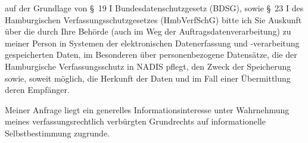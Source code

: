 auf der Grundlage von §~19 I Bundesdatenschutzgesetz (BDSG), sowie
§~23 I des Hamburgischen Verfassungsschutzgesetzes (HmbVerfSchG) bitte ich Sie
Auskunft über die durch Ihre Behörde (auch im Weg der Auftragsdatenverarbeitung)
zu meiner Person in Systemen der elektronischen Datenerfassung und -verarbeitung
gespeicherten Daten, im Besonderen über personenbezogene Datensätze, die der
Hamburgische Verfassungsschutz in NADIS pflegt, den Zweck der Speicherung sowie,
soweit möglich, die Herkunft der Daten und im Fall einer Übermittlung deren
Empfänger.

Meiner Anfrage liegt ein generelles Informationsinteresse unter Wahrnehmung
meines verfassungsrechtlich verbürgten Grundrechts auf informationelle
Selbstbestimmung zugrunde.
